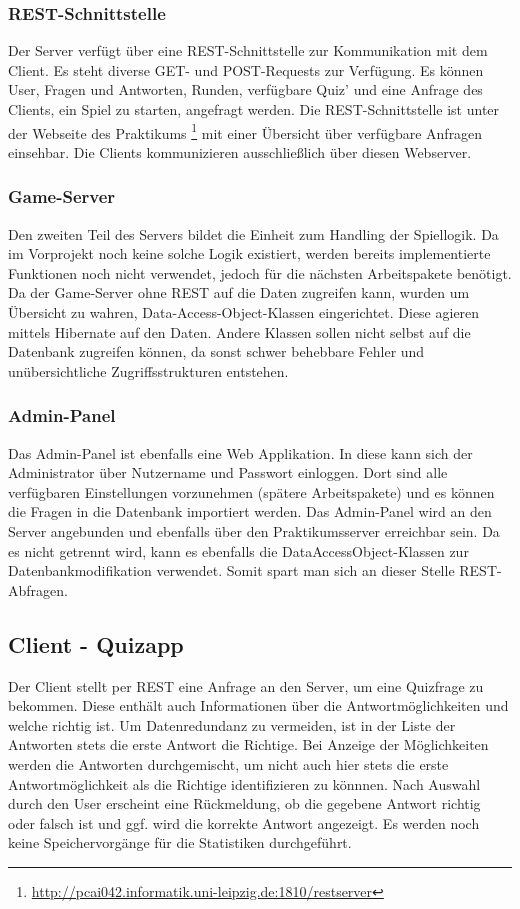 \documentclass[11pt,a4paper]{scrreprt}
\begin{document}
\subsubsection{REST-Schnittstelle}
Der Server verfügt über eine REST-Schnittstelle zur Kommunikation mit dem Client. Es steht diverse GET- und POST-Requests zur Verfügung. Es können User, Fragen und Antworten, Runden, verfügbare Quiz' und eine Anfrage des Clients, ein Spiel zu starten, angefragt werden. Die REST-Schnittstelle ist unter der Webseite des Praktikums \footnote{\url{http://pcai042.informatik.uni-leipzig.de:1810/restserver}} mit einer Übersicht über verfügbare Anfragen einsehbar. Die Clients kommunizieren ausschließlich über diesen Webserver.

\subsubsection{Game-Server}
Den zweiten Teil des Servers bildet die Einheit zum Handling der Spiellogik. Da im Vorprojekt noch keine solche Logik existiert, werden bereits implementierte Funktionen noch nicht verwendet, jedoch für die nächsten Arbeitspakete benötigt. Da der Game-Server ohne REST auf die Daten zugreifen kann, wurden um Übersicht zu wahren, Data-Access-Object-Klassen eingerichtet. Diese agieren mittels Hibernate auf den Daten. Andere Klassen sollen nicht selbst auf die Datenbank zugreifen können, da sonst schwer behebbare Fehler und unübersichtliche Zugriffsstrukturen entstehen.

\subsubsection{Admin-Panel}
Das Admin-Panel ist ebenfalls eine Web Applikation. In diese kann sich der Administrator über Nutzername und Passwort einloggen. Dort sind alle verfügbaren Einstellungen vorzunehmen (spätere Arbeitspakete) und es können die Fragen in die Datenbank importiert werden. Das Admin-Panel wird an den Server angebunden und ebenfalls über den Praktikumsserver erreichbar sein. Da es nicht getrennt wird, kann es ebenfalls die DataAccessObject-Klassen zur Datenbankmodifikation verwendet. Somit spart man sich an dieser Stelle REST-Abfragen.

\subsection{Client - Quizapp}
Der Client stellt per REST eine Anfrage an den Server, um eine Quizfrage zu bekommen. Diese enthält auch Informationen über die Antwortmöglichkeiten und welche richtig ist. Um Datenredundanz zu vermeiden, ist in der Liste der Antworten stets die erste Antwort die Richtige. Bei Anzeige der Möglichkeiten werden die Antworten durchgemischt, um nicht auch hier stets die erste Antwortmöglichkeit als die Richtige identifizieren zu könnnen. Nach Auswahl durch den User erscheint eine Rückmeldung, ob die gegebene Antwort richtig oder falsch ist und ggf. wird die korrekte Antwort angezeigt. Es werden noch keine Speichervorgänge für die Statistiken durchgeführt. 
\end{document}
